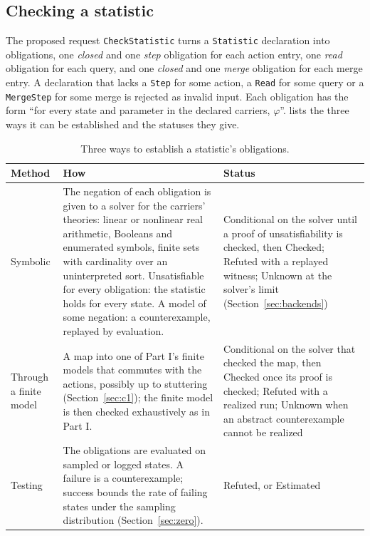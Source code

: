 \documentclass[11pt]{article}
\newcommand{\code}[1]{\texttt{#1}}
\theoremstyle{definition}
\theoremstyle{plain}
\begin{document}
\subsection{Checking a statistic}\label{sec:checking}

The proposed request \code{CheckStatistic} turns a \code{Statistic} declaration into obligations,
one \emph{closed} and one \emph{step} obligation for each action entry, one \emph{read} obligation
for each query, and one \emph{closed} and one \emph{merge} obligation for each merge entry. A
declaration that lacks a \code{Step} for some action, a \code{Read} for some query or a
\code{MergeStep} for some merge is rejected as invalid input. Each obligation has the form
``for every state and parameter in the declared carriers, $\varphi$''.  lists the
three ways it can be established and the statuses they give.

\begin{table}[ht]
\centering\small
\begin{tabularx}{\textwidth}{>{\raggedright\arraybackslash}p{3.0cm}>{\raggedright\arraybackslash}X>{\raggedright\arraybackslash}p{3.3cm}}
\toprule
Method & How & Status\\
\midrule
Symbolic & The negation of each obligation is given to a solver for the carriers' theories: linear
or nonlinear real arithmetic, Booleans and enumerated symbols, finite sets with cardinality over an
uninterpreted sort. Unsatisfiable for every obligation: the statistic holds for every state. A
model of some negation: a counterexample, replayed by evaluation. & Conditional on the solver
until a proof of unsatisfiability is checked, then Checked; Refuted with a replayed witness;
Unknown at the solver's limit (Section~\ref{sec:backends})\\
Through a finite model & A map into one of Part I's finite models that commutes with the actions,
possibly up to stuttering (Section~\ref{sec:c1}); the finite model is then checked exhaustively as
in
Part I. & Conditional on the solver that checked the map, then Checked once its proof is
checked; Refuted with a realized run; Unknown when an abstract
counterexample cannot be realized\\
Testing & The obligations are evaluated on sampled or logged states. A failure is a counterexample;
success bounds the rate of failing states under the sampling distribution
(Section~\ref{sec:zero}). & Refuted, or Estimated\\
\bottomrule
\end{tabularx}
\caption{Three ways to establish a statistic's obligations.}\label{tab:methods}
\end{table}
\end{document}
